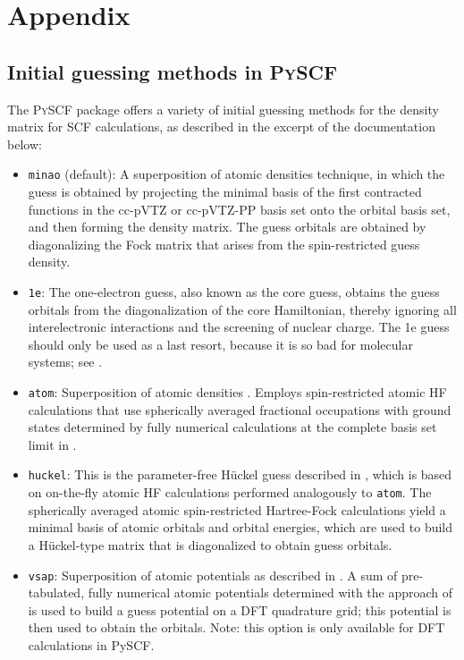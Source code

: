 \appendix
\chapter{Appendix}
\label{sec:appendix}

\section{Initial guessing methods in \textsc{PySCF} \parencite{ref:pyscf}}
\label{sec:pyscf_initial_guessing_methods}
The \textsc{PySCF} package offers a variety of initial guessing methods for the density matrix for SCF calculations, as described in the excerpt of the documentation \parencite{ref:pyscf_user_guide} below: 
\begin{itemize}
    \item \texttt{minao} (default): A superposition of atomic densities \parencite{ref:minao_sad1,ref:minao_sad2} technique, in which the guess is obtained by projecting the minimal basis of the first contracted functions in the cc-pVTZ or cc-pVTZ-PP basis set onto the orbital basis set, and then forming the density matrix. The guess orbitals are obtained by diagonalizing the Fock matrix that arises from the spin-restricted guess density.

    \item \texttt{1e}: The one-electron guess, also known as the core guess, obtains the guess orbitals from the diagonalization of the core Hamiltonian, thereby ignoring all interelectronic interactions and the screening of nuclear charge. The 1e guess should only be used as a last resort, because it is so bad for molecular systems; see \parencite{ref:Lehtola2019}.

    \item \texttt{atom}: Superposition of atomic densities \parencite{ref:minao_sad1,ref:minao_sad2}. Employs spin-restricted atomic HF calculations that use spherically averaged fractional occupations with ground states determined by fully numerical calculations at the complete basis set limit in \parencite{ref:lethola_fully_numerical_atomic_potentials}.

    \item \texttt{huckel}: This is the parameter-free Hückel guess described in \parencite{ref:Lehtola2019}, which is based on on-the-fly atomic HF calculations performed analogously to \texttt{atom}. The spherically averaged atomic spin-restricted Hartree-Fock calculations yield a minimal basis of atomic orbitals and orbital energies, which are used to build a Hückel-type matrix that is diagonalized to obtain guess orbitals.

    \item \texttt{vsap}: Superposition of atomic potentials as described in \parencite{ref:Lehtola2019}. A sum of pre-tabulated, fully numerical atomic potentials determined with the approach of \parencite{ref:lethola_fully_numerical_atomic_potentials} is used to build a guess potential on a DFT quadrature grid; this potential is then used to obtain the orbitals. Note: this option is only available for DFT calculations in PySCF.
\end{itemize}



